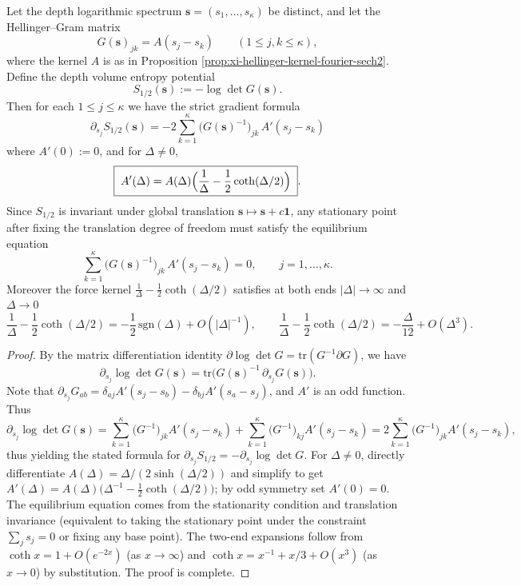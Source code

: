 \begin{proposition}\label{prop:xi-hellinger-gram-first-variation-equilibrium}
Let the depth logarithmic spectrum \(\mathbf s=(s_1,\dots,s_\kappa)\) be distinct, and let the Hellinger--Gram matrix
\[
G(\mathbf s)_{jk}=A(s_j-s_k)\qquad(1\le j,k\le \kappa),
\]
where the kernel \(A\) is as in Proposition \ref{prop:xi-hellinger-kernel-fourier-sech2}.
Define the depth volume entropy potential
\[
S_{1/2}(\mathbf s):=-\log\det G(\mathbf s).
\]
Then for each \(1\le j\le \kappa\) we have the strict gradient formula
\[
\boxed{\;
\partial_{s_j}S_{1/2}(\mathbf s)
=-2\sum_{k=1}^{\kappa}\bigl(G(\mathbf s)^{-1}\bigr)_{jk}\,A'(s_j-s_k)\;}
\]
where \(A'(0):=0\), and for \(\Delta\neq 0\),
\[
\boxed{\;
A'(\Delta)
=A(\Delta)\Bigl(\frac{1}{\Delta}-\frac12\coth(\Delta/2)\Bigr)\; }.
\]
Since \(S_{1/2}\) is invariant under global translation \(\mathbf s\mapsto \mathbf s+c\mathbf 1\), any stationary point after fixing the translation degree of freedom must satisfy the equilibrium equation
\[
\sum_{k=1}^{\kappa}\bigl(G(\mathbf s)^{-1}\bigr)_{jk}\,A'(s_j-s_k)=0,\qquad j=1,\dots,\kappa.
\]
Moreover the force kernel \(\frac{1}{\Delta}-\frac12\coth(\Delta/2)\) satisfies at both ends \(|\Delta|\to\infty\) and \(\Delta\to 0\)
\[
\frac{1}{\Delta}-\frac12\coth(\Delta/2)= -\frac12\,\mathrm{sgn}(\Delta)+O(|\Delta|^{-1}),
\qquad
\frac{1}{\Delta}-\frac12\coth(\Delta/2)=-\frac{\Delta}{12}+O(\Delta^3).
\]
\end{proposition}
\begin{proof}
By the matrix differentiation identity \(\partial\log\det G=\mathrm{tr}(G^{-1}\partial G)\), we have
\[
\partial_{s_j}\log\det G(\mathbf s)=\mathrm{tr}\bigl(G(\mathbf s)^{-1}\,\partial_{s_j}G(\mathbf s)\bigr).
\]
Note that \(\partial_{s_j}G_{ab}=\delta_{aj}A'(s_j-s_b)-\delta_{bj}A'(s_a-s_j)\), and \(A'\) is an odd function.
Thus
\[
\partial_{s_j}\log\det G(\mathbf s)
=\sum_{k=1}^{\kappa}\bigl(G^{-1}\bigr)_{jk}A'(s_j-s_k)
+\sum_{k=1}^{\kappa}\bigl(G^{-1}\bigr)_{kj}A'(s_j-s_k)
=2\sum_{k=1}^{\kappa}\bigl(G^{-1}\bigr)_{jk}A'(s_j-s_k),
\]
thus yielding the stated formula for \(\partial_{s_j}S_{1/2}=-\partial_{s_j}\log\det G\).
For \(\Delta\neq 0\), directly differentiate \(A(\Delta)=\Delta/(2\sinh(\Delta/2))\) and simplify to get
\(
A'(\Delta)=A(\Delta)\bigl(\Delta^{-1}-\tfrac12\coth(\Delta/2)\bigr)
\); by odd symmetry set \(A'(0)=0\).
The equilibrium equation comes from the stationarity condition and translation invariance (equivalent to taking the stationary point under the constraint \(\sum_j s_j=0\) or fixing any base point).
The two-end expansions follow from \(\coth x=1+O(e^{-2x})\) (as \(x\to\infty\)) and
\(\coth x=x^{-1}+x/3+O(x^3)\) (as \(x\to 0\)) by substitution. The proof is complete.
\end{proof}

